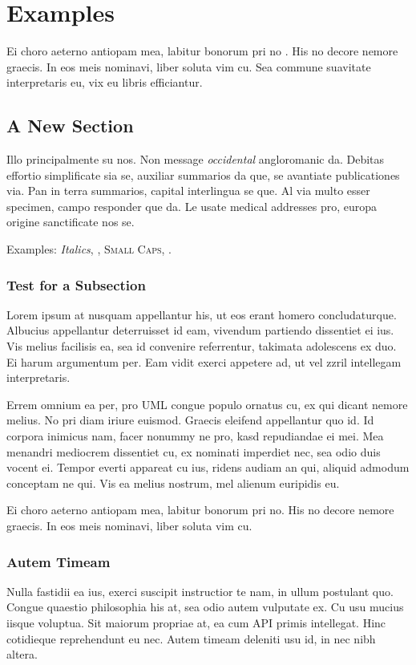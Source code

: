 \chapter{Examples}\label{ch:examples}
Ei choro aeterno antiopam mea, labitur bonorum pri no 
 \citep{dueck:trio}. His no decore
nemore graecis. In eos meis nominavi, liber soluta vim cu. Sea commune
suavitate interpretaris eu, vix eu libris efficiantur.
\section{A New Section}
Illo principalmente su nos. Non message \emph{occidental} angloromanic
da. Debitas effortio simplificate sia se, auxiliar summarios da que,
se avantiate publicationes via. Pan in terra summarios, capital
interlingua se que. Al via multo esser specimen, campo responder que
da. Le usate medical addresses pro, europa origine sanctificate nos
se.

Examples: \textit{Italics}, , \textsc{Small
Caps}, .

\subsection{Test for a Subsection}
Lorem ipsum at nusquam appellantur his, ut eos erant homero
concludaturque. Albucius appellantur deterruisset id eam, vivendum
partiendo dissentiet ei ius. Vis melius facilisis ea, sea id convenire
referrentur, takimata adolescens ex duo. Ei harum argumentum per. Eam
vidit exerci appetere ad, ut vel zzril intellegam interpretaris.

Errem omnium ea per, pro \ac{UML} congue populo ornatus cu, ex qui
dicant nemore melius. No pri diam iriure euismod. Graecis eleifend
appellantur quo id. Id corpora inimicus nam, facer nonummy ne pro,
kasd repudiandae ei mei. Mea menandri mediocrem dissentiet cu, ex
nominati imperdiet nec, sea odio duis vocent ei. Tempor everti
appareat cu ius, ridens audiam an qui, aliquid admodum conceptam ne
qui. Vis ea melius nostrum, mel alienum euripidis eu.

Ei choro aeterno antiopam mea, labitur bonorum pri no. His no decore
nemore graecis. In eos meis nominavi, liber soluta vim cu.

\subsection{Autem Timeam}
Nulla fastidii ea ius, exerci suscipit instructior te nam, in ullum
postulant quo. Congue quaestio philosophia his at, sea odio autem
vulputate ex. Cu usu mucius iisque voluptua. Sit maiorum propriae at,
ea cum \ac{API} primis intellegat. Hinc cotidieque reprehendunt eu
nec. Autem timeam deleniti usu id, in nec nibh altera.

